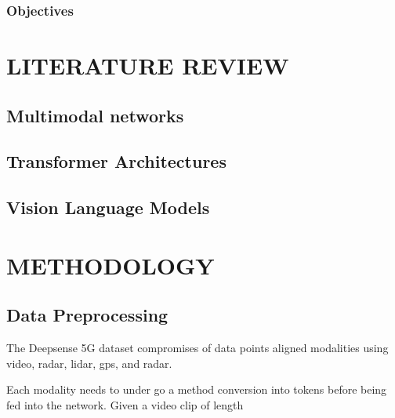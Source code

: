 \documentclass{UCF_ETD}
\begin{document}
\subsection{Objectives}


\chapter{LITERATURE REVIEW}



\section{Multimodal networks}

\section{Transformer Architectures}

\section{Vision Language Models}


\chapter{METHODOLOGY}
\section{Data Preprocessing}
The Deepsense 5G dataset compromises of data points aligned modalities using video, radar, lidar, gps, and radar.

Each modality needs to under go a method conversion into tokens before being fed into the network. Given a video clip of length 
\end{document}
